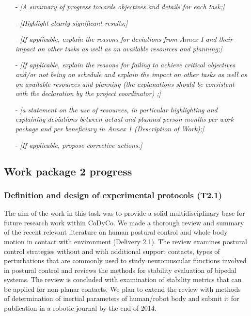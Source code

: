 \documentclass[12pt,a4paper,twoside]{article}
\begin{document}
\begin{itemize}
\item[-] \emph{\color{red}[A summary of progress towards objectives and details for each task;]}
\item[-] \emph{\color{red}[Highlight clearly significant results;]}
\item[-] \emph{\color{red}[If applicable, explain the reasons for deviations from Annex I and their impact on other tasks as well as on available resources and planning;]}
\item[-] \emph{\color{red}[If applicable, explain the reasons for failing to achieve critical objectives and/or not being on schedule and explain the impact on other tasks as well as on available resources and planning (the explanations should be consistent with the declaration by the project coordinator) ;]}
\item[-] \emph{\color{red}[a statement on the use of resources, in particular highlighting and explaining deviations between actual and planned  person-months per work package and per beneficiary in Annex 1 (Description of Work);]}
\item[-] \emph{\color{red}[If applicable, propose corrective actions.]}
\end{itemize}

\subsection{Work package 2 progress}

\subsubsection{Definition and design of experimental protocols (T2.1)}

The aim of the work in this task was to provide a solid multidisciplinary base for future research work within CoDyCo. We made a thorough review and summary of the recent relevant literature on human postural control and whole body motion in contact with environment (Delivery 2.1). The review examines postural control strategies without and with additional support contacts, types of perturbations that are commonly used to study neuromuscular functions involved in postural control and reviews the methods for stability evaluation of bipedal systems. The review is concluded with examination of stability metrics that can be applied for non-planar contacts. We plan to extend the review with methods of determination of inertial parameters of human/robot body and submit it for publication in a robotic journal by the end of 2014.
\end{document}
